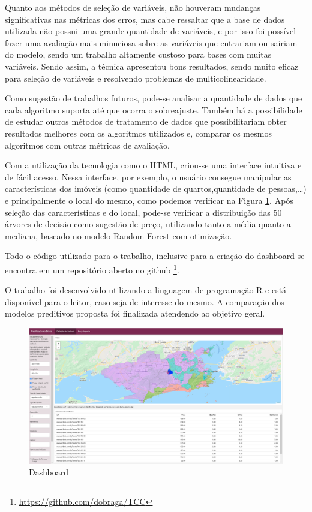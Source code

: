 \documentclass[
	12pt,				%
	a4paper,		%
	oneside,    %
	chapter=TITLE,		   %
	section=TITLE,		   %
	subsection=TITLE,	   %
	subsubsection=TITLE, %
	english,			%
	french,				%
	spanish,			%
	brazil,				%
]{abntex2}
\begin{document}
Quanto aos métodos de seleção de variáveis, não houveram mudanças
significativas nas métricas dos erros, mas cabe ressaltar que a base de
dados utilizada não possui uma grande quantidade de variáveis, e por
isso foi possível fazer uma avaliação mais minuciosa sobre as variáveis
que entrariam ou sairiam do modelo, sendo um trabalho altamente custoso
para bases com muitas variáveis. Sendo assim, a técnica apresentou bons
resultados, sendo muito eficaz para seleção de variáveis e resolvendo
problemas de multicolinearidade.

Como sugestão de trabalhos futuros, pode-se analisar a quantidade de
dados que cada algoritmo suporta até que ocorra o sobreajuste. Também há
a possibilidade de estudar outros métodos de tratamento de dados que
possibilitariam obter resultados melhores com os algoritmos utilizados
e, comparar os mesmos algoritmos com outras métricas de avaliação.

Com a utilização da tecnologia como o HTML, criou-se uma interface
intuitiva e de fácil acesso. Nessa interface, por exemplo, o usuário
consegue manipular as características dos imóveis (como quantidade de
quartos,quantidade de pessoas,\ldots) e principalmente o local do mesmo,
como podemos verificar na Figura \ref{fig:dash}. Após seleção das
características e do local, pode-se verificar a distribuição das 50
árvores de decisão como sugestão de preço, utilizando tanto a média
quanto a mediana, baseado no modelo Random Forest com otimização.

Todo o código utilizado para o trabalho, inclusive para a criação do
dashboard se encontra em um repositório aberto no github
\footnote{\url{https://github.com/dobraga/TCC}}.

O trabalho foi desenvolvido utilizando a linguagem de programação R e
está disponível para o leitor, caso seja de interesse do mesmo. A
comparação dos modelos preditivos proposta foi finalizada atendendo ao
objetivo geral.

\begin{figure}
\centering
\includegraphics[width=\textwidth,height=0.3\textheight]{../fig/dash.png}
\caption{Dashboard\label{fig:dash}}
\end{figure}
\end{document}
